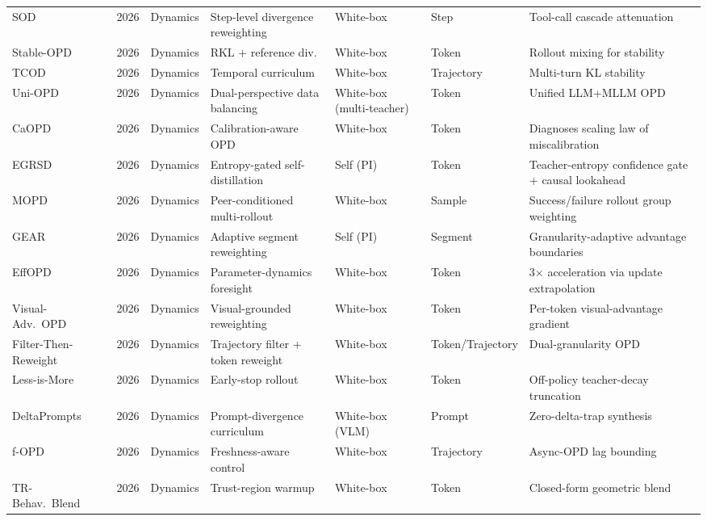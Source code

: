 \documentclass{article} %
\begin{document}
\begin{table}[t]
{\begin{tabular}{@{}lclllll@{}}
        SOD~\citep{2605.07725} & 2026 & Dynamics & Step-level divergence reweighting & White-box & Step & Tool-call cascade attenuation \\
        Stable-OPD~\citep{2604.08527} & 2026 & Dynamics & RKL + reference div. & White-box & Token & Rollout mixing for stability \\
        TCOD~\citep{2604.24005} & 2026 & Dynamics & Temporal curriculum & White-box & Trajectory & Multi-turn KL stability \\
        Uni-OPD~\citep{2605.03677} & 2026 & Dynamics & Dual-perspective data balancing & White-box (multi-teacher) & Token & Unified LLM+MLLM OPD \\
        CaOPD~\citep{2604.16830} & 2026 & Dynamics & Calibration-aware OPD & White-box & Token & Diagnoses scaling law of miscalibration \\
        EGRSD~\citep{2605.13255} & 2026 & Dynamics & Entropy-gated self-distillation & Self (PI) & Token & Teacher-entropy confidence gate + causal lookahead \\
        MOPD~\citep{2605.12652} & 2026 & Dynamics & Peer-conditioned multi-rollout & White-box & Sample & Success/failure rollout group weighting \\
        GEAR~\citep{2605.11853} & 2026 & Dynamics & Adaptive segment reweighting & Self (PI) & Segment & Granularity-adaptive advantage boundaries \\
        EffOPD~\citep{2605.11739} & 2026 & Dynamics & Parameter-dynamics foresight & White-box & Token & 3$\times$ acceleration via update extrapolation \\
        Visual-Adv.\ OPD~\citep{2605.21924} & 2026 & Dynamics & Visual-grounded reweighting & White-box & Token & Per-token visual-advantage gradient \\
        Filter-Then-Reweight~\citep{2606.02684} & 2026 & Dynamics & Trajectory filter + token reweight & White-box & Token/Trajectory & Dual-granularity OPD \\
        Less-is-More~\citep{2605.27028} & 2026 & Dynamics & Early-stop rollout & White-box & Token & Off-policy teacher-decay truncation \\
        DeltaPrompts~\citep{2605.15532} & 2026 & Dynamics & Prompt-divergence curriculum & White-box (VLM) & Prompt & Zero-delta-trap synthesis \\
        f-OPD~\citep{2605.17862} & 2026 & Dynamics & Freshness-aware control & White-box & Trajectory & Async-OPD lag bounding \\
        TR-Behav.\ Blend~\citep{2605.31159} & 2026 & Dynamics & Trust-region warmup & White-box & Token & Closed-form geometric blend \\

\end{tabular}}
\end{table}
\end{document}
